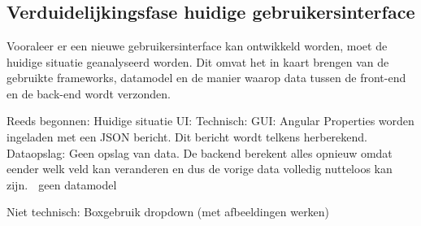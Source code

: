 
\chapter{}%
\label{ch:methodologie}


\section [Verduidelijkingsfase huidige situatie]{Verduidelijkingsfase huidige geb\-ruikersinterface}
Vooraleer er een nieuwe gebruikersinterface kan ontwikkeld worden, moet de huidige situatie geanalyseerd worden. Dit omvat het in kaart brengen van de gebruikte frameworks, datamodel en de manier waarop data tussen de front-end en de back-end wordt verzonden.

Reeds begonnen:
Huidige situatie UI:
Technisch:
GUI: Angular
Properties worden ingeladen met een JSON bericht. Dit bericht wordt telkens herberekend.
Dataopslag: Geen opslag van data. De backend berekent alles opnieuw omdat eender welk veld kan veranderen en dus de vorige data volledig nutteloos kan zijn.  geen datamodel

Niet technisch:
Boxgebruik
dropdown 
(met afbeeldingen werken)



